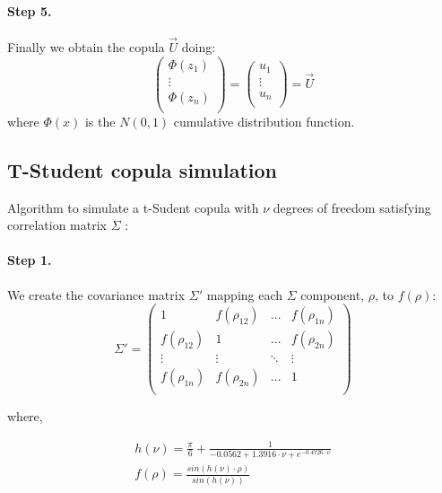 \documentclass[a4paper,12pt,final]{article}
\begin{document}
\paragraph{Step 5.} Finally we obtain the copula $\vec{U}$ doing:
\begin{displaymath}
\left(
\begin{array}{c}
\Phi(z_1) \\
\vdots    \\
\Phi(z_n) \\
\end{array}
\right) 
=
\left(
\begin{array}{c}
u_1    \\
\vdots \\
u_n    \\
\end{array}
\right) 
=
\vec{U} 
\end{displaymath}
where $\Phi(x)$ is the $N(0,1)$ cumulative distribution function.

\subsection{T-Student copula simulation}
\label{ap:tstudentcopu}
Algorithm to simulate a t-Sudent copula with $\nu$ degrees of freedom
satisfying correlation matrix $\Sigma$ \cite{copu:pricing}:

\paragraph{Step 1.} We create the covariance matrix $\Sigma'$ mapping 
each $\Sigma$ component, $\rho$, to $f(\rho)$:
\begin{displaymath}
\Sigma' = \left( 
\begin{array}{cccc}
1            & f(\rho_{12}) & \ldots & f(\rho_{1n})\\
f(\rho_{12}) & 1            & \ldots & f(\rho_{2n})\\
\vdots       & \vdots       & \ddots & \vdots      \\
f(\rho_{1n}) & f(\rho_{2n}) & \ldots & 1           \\
\end{array}
\right)
\end{displaymath}

where,

\begin{displaymath}
\begin{array}{l}
h(\nu) = \frac{\pi}{6} + \frac{1}{-0.0562 + 1.3916 \cdot \nu + e^{-0.4726 \cdot \nu} } \\
f(\rho) = \frac{sin(h(\nu) \cdot \rho)}{sin(h(\nu))} \\
\end{array}
\end{displaymath}
\newline
\end{document}
